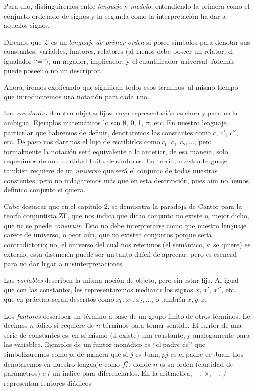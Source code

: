\documentclass[11pt,a4paper]{book}
\begin{document}
Para ello, distinguiremos entre \textit{lenguaje} y \textit{modelo}, entendiendo la primera como el conjunto ordenado de signos y la segunda como la interpretación ha dar a aquellos signos.
\begin{mydef}
	Diremos que $\mathcal{L}$ es un \textit{lenguaje de primer orden} si posee símbolos para denotar sus constantes, variables, funtores, relatores (al menos debe poseer un relator, el igualador ``=''), un negador, implicador, y el cuantificador universal. Además puede poseer o no un descriptor.
\end{mydef}
Ahora, iremos explicando que significan todos esos términos, al mismo tiempo que introduciremos una notación para cada uno.

Las \textit{constantes} denotan objetos fijos, cuya representación es clara y para nada ambigua. Ejemplos matemáticos lo son $\emptyset$, 0, 1, $\pi$, etc. En nuestro lenguaje particular que habremos de definir, denotaremos las constantes como $c,\,c',\,c''$, etc. De paso nos daremos el lujo de escribirlos como $c_0, c_1, c_2, \dots$, pero formalmente la notación será equivalente a la anterior, de esa manera, solo requerimos de una cantidad finita de símbolos. En teoría, nuestro lenguaje también requiere de un \textit{universo} que será el conjunto de todas nuestras constantes, pero no indagaremos más que en esta descripción, pues aún no hemos definido conjunto si quiera.

Cabe destacar que en el capítulo 2, se demuestra la paradoja de Cantor para la teoría conjuntista ZF, que nos indica que dicho conjunto no existe o, mejor dicho, que no se puede \textit{construir}. Esto no debe interpretarse como que nuestro lenguaje carece de universo, o peor aún, que no existen conjuntos porque sería contradictorio; no, el universo del cual nos referimos (el semántico, si se quiere) es externo, esta distinción puede ser un tanto difícil de apreciar, pero es esencial para no dar lugar a misinterpretaciones.

Las \textit{variables} describen la misma noción de objeto, pero sin estar fijo. Al igual que con las constantes, les representaremos mediante los signos $x,\,x',\,x''$, etc., que en práctica serán descritos como $x_0,x_1,x_2,\dots$, o también $x,y,z$.

Los \textit{funtores} describen un término a base de un grupo finito de otros términos. Le decimos $n$-ádico si requiere de $n$ términos para tomar sentido. El funtor de una serie de constantes es, en sí mismo (si existe) una constante, y analogamente para las variables. Ejemplos de un funtor monádico es ``el padre de'' que simbolizaremos como $p$, de manera que si $j$ es Juan, $pj$ es el padre de Juan. Los denotaremos en nuestro lenguaje como $f_i^n$, donde $n$ es su orden (cantidad de parámetros) e $i$ un índice para diferenciarlos. En la aritmética, $+$, $\times$, $-$, $/$ representan funtores diádicos.
\end{document}
